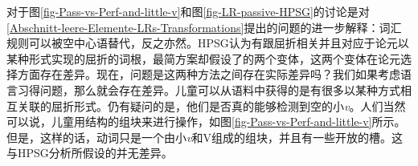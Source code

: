 对于图\ref{fig-Pass-vs-Perf-and-little-v}和图\ref{fig-LR-passive-HPSG}的讨论是对\ref{Abschnitt-leere-Elemente-LRs-Transformations}提出的问题的进一步解释：词汇规则可以被空中心语替代，反之亦然。HPSG认为有跟屈折相关并且对应于论元以某种形式实现的屈折的词根，最简方案却假设了\littlevc 的两个变体，这两个变体在论元选择方面存在差异。现在，问题是这两种方法之间存在实际差异吗？我们如果考虑语言习得问题，那么就会存在差异。儿童可以从语料中获得的是有很多以某种方式相互关联的屈折形式。仍有疑问的是，他们是否真的能够检测到空的小\textit{v}。人们当然可以说，儿童用结构的组块来进行操作，如图\ref{fig-Pass-vs-Perf-and-little-v}所示。但是，这样的话，动词只是一个由小\textit{v}和V组成的组块，并且有一些开放的槽。这与HPSG分析所假设的并无差异。


